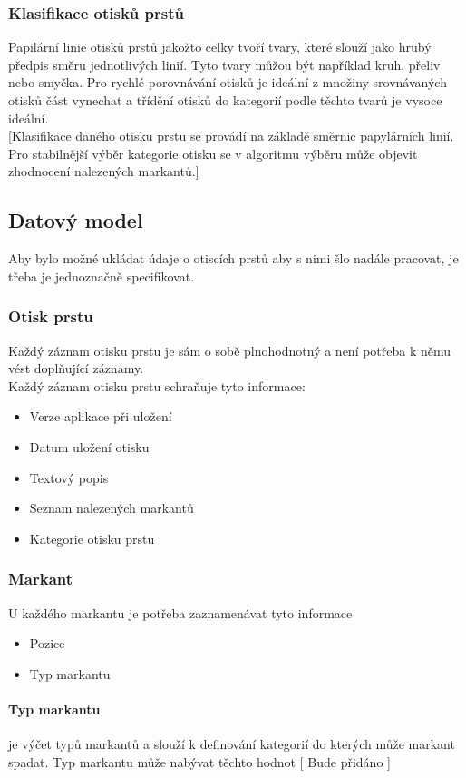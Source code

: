 \documentclass[12pt,a4paper]{article}
\begin{document}
\subsubsection{Klasifikace otisků prstů}
Papilární linie otisků prstů jakožto celky tvoří tvary, které slouží jako hrubý předpis směru jednotlivých linií. Tyto tvary můžou být například kruh, přeliv nebo smyčka. Pro rychlé porovnávání otisků je ideální z množiny srovnávaných otisků část vynechat a třídění otisků do kategorií podle těchto tvarů je vysoce ideální. \\
{[}Klasifikace daného otisku prstu se provádí na základě směrnic papylárních linií. Pro stabilnější výběr kategorie otisku se v algoritmu výběru může objevit zhodnocení nalezených markantů.{]}
\subsection{Datový model}
Aby bylo možné ukládat údaje o otiscích prstů aby s nimi šlo nadále pracovat, je třeba je jednoznačně specifikovat.
\subsubsection{Otisk prstu}
Každý záznam otisku prstu je sám o sobě plnohodnotný a není potřeba k němu vést doplňující záznamy. \\
Každý záznam otisku prstu schraňuje tyto informace:
\begin{itemize}
\setlength\itemsep{-0.3cm}
\item Verze aplikace při uložení
\item Datum uložení otisku
\item Textový popis
\item Seznam nalezených markantů
\item Kategorie otisku prstu
\end{itemize}
\subsubsection{Markant}
U každého markantu je potřeba zaznamenávat tyto informace
\begin{itemize}
\setlength\itemsep{-0.3cm}
\item Pozice
\item Typ markantu
\end{itemize}
\paragraph{Typ markantu} je výčet typů markantů a slouží k definování kategorií do kterých může markant spadat.
Typ markantu může nabývat těchto hodnot {[} Bude přidáno {]}
\end{document}
